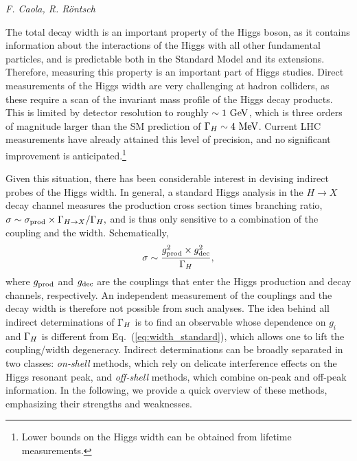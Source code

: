 \begin{center}{\it F. Caola, 
R. R\"ontsch} \end{center}

The total decay width is an important property of the Higgs boson,
as it contains information about the interactions of the Higgs with all other
fundamental particles, and is predictable both in the Standard Model and its extensions.
Therefore, measuring this property is an important part of Higgs studies. 
%
Direct measurements of the Higgs width are very challenging at hadron colliders,
as these require a scan of the invariant mass profile of the Higgs decay
products.
This is limited by detector resolution to roughly $\sim 1~{\rm GeV}$,
which is  three orders of magnitude larger than the SM prediction of  ${\Gamma_H}\sim 4~{\rm MeV}$.
Current LHC measurements have already attained this level of precision, and no significant improvement
is anticipated.\footnote{Lower bounds
on the Higgs width can be obtained
from lifetime measurements.}

Given this situation, there has been considerable interest in devising indirect probes of the
Higgs width. In general, a standard Higgs analysis in the $H\to X$ decay channel 
measures the production cross section times branching ratio,
$\sigma \sim \sigma_{\rm prod}\times {\Gamma_{H\to X}}/{\Gamma_H},$
and is thus  only sensitive to a combination of the coupling and the width. Schematically,
\begin{equation}
\sigma \sim \frac{g_{\rm prod}^2 \times g_{\rm dec}^2}{{\Gamma_H}},
\label{eq:width_standard}
\end{equation}
where $g_{\rm prod}$ and $g_{\rm dec}$ are the couplings that enter the Higgs production
and decay channels, respectively. An independent measurement of the couplings and the decay width is 
therefore not possible from such analyses. The idea
behind all indirect determinations of ${\Gamma_H}$ is to find an observable whose dependence on
$g_i$ and ${\Gamma_H}$ is different from Eq.~(\ref{eq:width_standard}), which allows one
to lift the coupling/width degeneracy. Indirect determinations can be broadly separated in two
classes: \emph{on-shell} methods, which rely on delicate interference effects on the Higgs resonant
peak, and \emph{off-shell} methods, which combine on-peak and off-peak information. In the
following, we provide a quick overview of these methods, emphasizing their strengths and weaknesses. 

